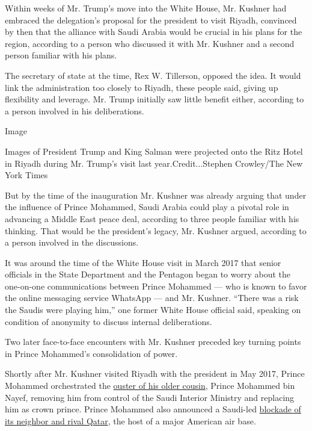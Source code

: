 Within weeks of Mr. Trump's move into the White House, Mr. Kushner had
embraced the delegation's proposal for the president to visit Riyadh,
convinced by then that the alliance with Saudi Arabia would be crucial
in his plans for the region, according to a person who discussed it with
Mr. Kushner and a second person familiar with his plans.

The secretary of state at the time, Rex W. Tillerson, opposed the idea.
It would link the administration too closely to Riyadh, these people
said, giving up flexibility and leverage. Mr. Trump initially saw little
benefit either, according to a person involved in his deliberations.

Image

Images of President Trump and King Salman were projected onto the Ritz
Hotel in Riyadh during Mr. Trump's visit last year.Credit...Stephen
Crowley/The New York Times

But by the time of the inauguration Mr. Kushner was already arguing that
under the influence of Prince Mohammed, Saudi Arabia could play a
pivotal role in advancing a Middle East peace deal, according to three
people familiar with his thinking. That would be the president's legacy,
Mr. Kushner argued, according to a person involved in the discussions.

It was around the time of the White House visit in March 2017 that
senior officials in the State Department and the Pentagon began to worry
about the one-on-one communications between Prince Mohammed --- who is
known to favor the online messaging service WhatsApp --- and Mr.
Kushner. ``There was a risk the Saudis were playing him,'' one former
White House official said, speaking on condition of anonymity to discuss
internal deliberations.

Two later face-to-face encounters with Mr. Kushner preceded key turning
points in Prince Mohammed's consolidation of power.

Shortly after Mr. Kushner visited Riyadh with the president in May 2017,
Prince Mohammed orchestrated the
\href{https://www.nytimes.com/2017/06/21/world/middleeast/saudi-arabia-crown-prince-mohammed-bin-salman.html?module=inline}{ouster
of his older cousin}, Prince Mohammed bin Nayef, removing him from
control of the Saudi Interior Ministry and replacing him as crown
prince. Prince Mohammed also announced a Saudi-led
\href{https://www.nytimes.com/2017/07/02/world/middleeast/qatar-saudi-arabia-blockade.html?module=inline}{blockade
of its neighbor and rival Qatar}, the host of a major American air base.

